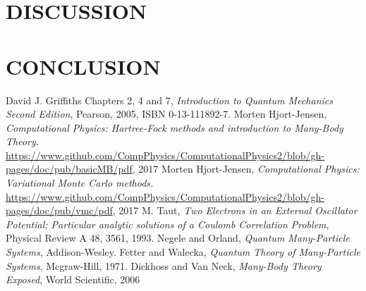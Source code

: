 \documentclass[a4paper, hidelinks, 10pt]{article}
\let\oldsection\section
\renewcommand{\section}[1]{\centering \oldsection{{#1}} \justifying}
\begin{document}
\section{DISCUSSION}
\label{sec:discussion}
\section{CONCLUSION}
\label{sec:conclusion}

\begin{thebibliography}{}
        David J. Griffiths Chapters 2, 4 and 7,
        \textit{Introduction to Quantum Mechanics Second Edition},
        Pearson, 2005, ISBN 0-13-111892-7.
        Morten Hjort-Jensen,
        \textit{Computational Physics: Hartree-Fock methods and introduction to Many-Body Theory.} \\
        \url{https://www.github.com/CompPhysics/ComputationalPhysics2/blob/gh-pages/doc/pub/basicMB/pdf}, 2017
        Morten Hjort-Jensen,
        \textit{Computational Physics: Variational Monte Carlo methods.} \\
        \url{https://www.github.com/CompPhysics/ComputationalPhysics2/blob/gh-pages/doc/pub/vmc/pdf}, 2017
        M. Taut, 
        \textit{Two Electrons in an External Oscillator Potential; Particular analytic solutions of a Coulomb Correlation Problem},
        Physical Review A 48, 3561, 1993.
        Negele and Orland,
        \textit{Quantum Many-Particle Systems},
        Addison-Wesley.
        Fetter and Walecka,
        \textit{Quantum Theory of Many-Particle Systems},
        Mcgraw-Hill, 1971.
        Dickhoss and Van Neck,
        \textit{Many-Body Theory Exposed},
        World Scientific, 2006
\end{thebibliography}
\end{document}
